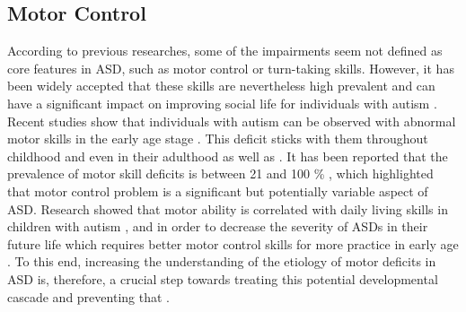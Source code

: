 \subsection{Motor Control}
According to previous researches, some of the impairments seem not defined as core features in 
ASD, such as motor control or turn-taking skills. However, it has been widely accepted that 
these skills are nevertheless high prevalent and can have a significant impact on improving 
social life for individuals with autism \cite{gowen2013motor}. Recent studies show that individuals
with autism can be observed with abnormal motor skills in the early age stage \cite{teitelbaum1998movement, provost2007comparison, brian2008clinical}.
This deficit sticks with them throughout childhood and even in their adulthood as 
well as \cite{fournier2010motor, ming2007prevalence, van2010stability}. It has been reported that
the prevalence of motor skill deficits is between 21 and 100 \% \cite{ghaziuddin1994clumsiness, manjiviona1995comparison, miyahara1997brief},
which highlighted that motor control problem is a significant but potentially variable aspect of ASD.
Research showed that motor ability is correlated with daily living skills in children with autism \cite{jasmin2009sensori}, 
and in order to decrease the severity of ASDs in their future life which requires better motor control 
skills for more practice in early age \cite{sutera2007predictors}. To this end, increasing the 
understanding of the etiology of motor deficits in ASD is, therefore, a crucial step towards treating 
this potential developmental cascade and preventing that \cite{gowen2013motor}.\\

